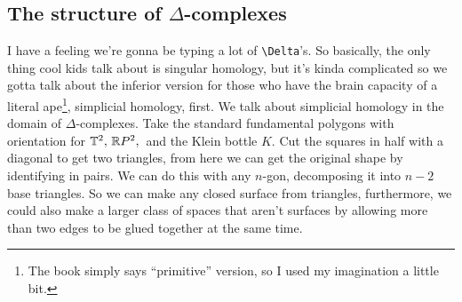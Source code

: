 \subsection{The structure of $\Delta$-complexes}
I have a feeling we're gonna be typing a lot of \texttt{\textbackslash Delta}'s. So basically, the only thing cool kids talk about is singular homology, but it's kinda complicated so we gotta talk about the inferior version for those who have the brain capacity of a literal ape\footnote{The book simply says ``primitive'' version, so I used my imagination a little bit.}, simplicial homology, first. We talk about simplicial homology in the domain of $\Delta $-complexes. Take the standard fundamental polygons with orientation for $\mathbb{T}^2,\,\mathbb{R} P^2,\,$ and the Klein bottle $K$. Cut the squares in half with a diagonal to get two triangles, from here we can get the original shape by identifying in pairs. We can do this with any $n$-gon, decomposing it into $n-2$ base triangles. So we can make any closed surface from triangles, furthermore, we could also make a larger class of spaces that aren't surfaces by allowing more than two edges to be glued together at the same time.

